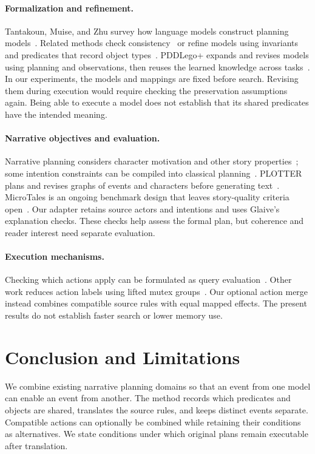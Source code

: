 \documentclass[letterpaper]{article}
\begin{document}
\paragraph{Formalization and refinement.}
Tantakoun, Muise, and Zhu survey how language models construct planning models~\cite{tantakoun2025formalizers}. Related methods check consistency~\cite{smirnov2024consistent} or refine models using invariants and predicates that record object types~\cite{casciani2025requirements}. PDDLego+ expands and revises models using planning and observations, then reuses the learned knowledge across tasks~\cite{gong2026iterative}. In our experiments, the models and mappings are fixed before search. Revising them during execution would require checking the preservation assumptions again. Being able to execute a model does not establish that its shared predicates have the intended meaning.

\paragraph{Narrative objectives and evaluation.}
Narrative planning considers character motivation and other story properties~\cite{riedl2010narrative,rivera2024story}; some intention constraints can be compiled into classical planning~\cite{haslum2012compilations}. PLOTTER plans and revises graphs of events and characters before generating text~\cite{gu2026plotter}. MicroTales is an ongoing benchmark design that leaves story-quality criteria open~\cite{siler2025microtales}. Our adapter retains source actors and intentions and uses Glaive's explanation checks. These checks help assess the formal plan, but coherence and reader interest need separate evaluation.

\paragraph{Execution mechanisms.}
Checking which actions apply can be formulated as query evaluation~\cite{correa2020lifted}. Other work reduces action labels using lifted mutex groups~\cite{kokel2023action}. Our optional action merge instead combines compatible source rules with equal mapped effects. The present results do not establish faster search or lower memory use.

\section{Conclusion and Limitations}
We combine existing narrative planning domains so that an event from one model can enable an event from another. The method records which predicates and objects are shared, translates the source rules, and keeps distinct events separate. Compatible actions can optionally be combined while retaining their conditions as alternatives. We state conditions under which original plans remain executable after translation.
\end{document}
